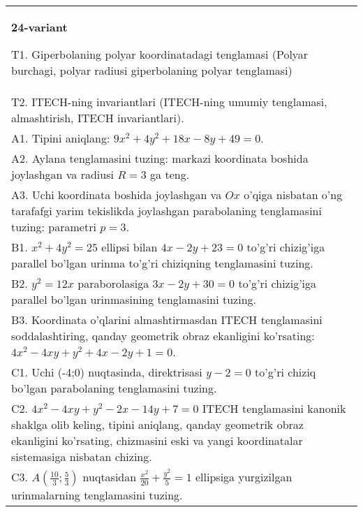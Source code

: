\documentclass{article}
\begin{document}
\begin{tabular}{m{17cm}}
\textbf{24-variant}
\newline

T1. Giperbolaning polyar koordinatadagi tenglamasi (Polyar burchagi, polyar radiusi giperbolaning polyar tenglamasi)\\

T2. ITECH-ning invariantlari (ITECH-ning umumiy tenglamasi, almashtirish, ITECH invariantlari).\\

A1. Tipini aniqlang: $9x^{2}+4y^{2}+18x-8y+49=0$.\\

A2. Aylana tenglamasini tuzing: markazi koordinata boshida joylashgan va radiusi $R=3$ ga teng.\\

A3. Uchi koordinata boshida joylashgan va $Ox$ o'qiga nisbatan o'ng tarafafgi yarim tekislikda joylashgan parabolaning tenglamasini tuzing: parametri $p=3$.\\

B1. $x^{2} + 4y^{2} = 25$ ellipsi bilan $4x - 2y + 23 = 0$ to'g'ri chizig'iga parallel bo'lgan urinma to'g'ri chiziqning tenglamasini tuzing.  \\

B2. $y^{2} = 12x$ paraborolasiga $3x - 2y + 30 = 0$ to'g'ri chizig'iga parallel bo'lgan urinmasining tenglamasini tuzing.  \\

B3. Koordinata o'qlarini almashtirmasdan ITECH tenglamasini soddalashtiring, qanday geometrik obraz ekanligini ko'rsating: $4x^{2} - 4xy + y^{2} + 4x - 2y + 1 = 0$.  \\

C1. Uchi (-4;0) nuqtasinda, direktrisasi $y - 2 = 0$ to'g'ri chiziq bo'lgan parabolaning tenglamasini tuzing.\\

C2. $4x^{2} - 4xy + y^{2} - 2x - 14y + 7 = 0$ ITECH tenglamasini kanonik shaklga olib keling, tipini aniqlang, qanday geometrik obraz ekanligini ko'rsating, chizmasini eski va yangi koordinatalar sistemasiga nisbatan chizing.  \\

C3. $A(\frac{10}{3};\frac{5}{3})$ nuqtasidan $\frac{x^{2}}{20} + \frac{y^{2}}{5} = 1$ ellipsiga yurgizilgan urinmalarning tenglamasini tuzing.  \\

\end{tabular}
\vspace{1cm}
\end{document}
